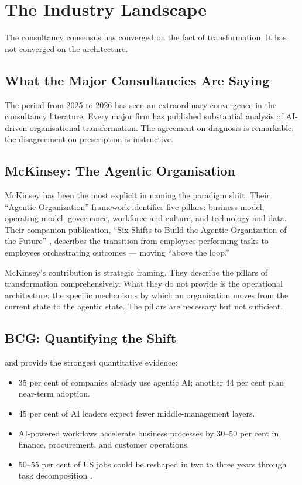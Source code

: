 \chapter{The Industry Landscape}
\label{ch:industry-landscape}

\epigraph{The consultancy consensus has converged on the fact of transformation. It has not converged on the architecture.}{}

\section{What the Major Consultancies Are Saying}

The period from 2025 to 2026 has seen an extraordinary convergence in the consultancy literature. Every major firm has published substantial analysis of AI-driven organisational transformation. The agreement on diagnosis is remarkable; the disagreement on prescription is instructive.

\section{McKinsey: The Agentic Organisation}

McKinsey has been the most explicit in naming the paradigm shift. Their ``Agentic Organization'' framework \parencite{McKinseyAgenticOrg2026} identifies five pillars: business model, operating model, governance, workforce and culture, and technology and data. Their companion publication, ``Six Shifts to Build the Agentic Organization of the Future'' \parencite{McKinseySixShifts2026}, describes the transition from employees performing tasks to employees orchestrating outcomes --- moving ``above the loop.''

McKinsey's contribution is strategic framing. They describe the pillars of transformation comprehensively. What they do not provide is the operational architecture: the specific mechanisms by which an organisation moves from the current state to the agentic state. The pillars are necessary but not sufficient.

\section{BCG: Quantifying the Shift}

\textcite{BCGAgenticShift2025} and \textcite{BCGAgenticEnterprise2025} provide the strongest quantitative evidence:

\begin{itemize}
  \item 35 per cent of companies already use agentic AI; another 44 per cent plan near-term adoption.
  \item 45 per cent of AI leaders expect fewer middle-management layers.
  \item AI-powered workflows accelerate business processes by 30--50 per cent in finance, procurement, and customer operations.
  \item 50--55 per cent of US jobs could be reshaped in two to three years through task decomposition \parencite{BCGJobsReshaping2026}.
\end{itemize}

